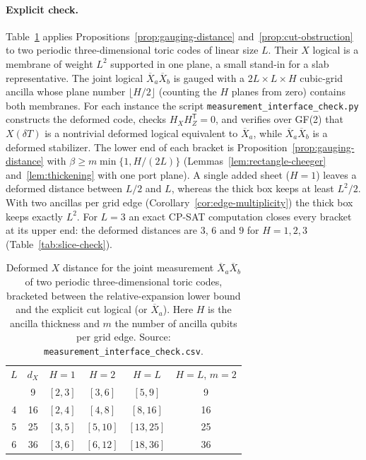 \documentclass[aps,prx,reprint,superscriptaddress,nofootinbib,floatfix,longbibliography]{revtex4-2}
\theoremstyle{definition}
\begin{document}
\paragraph{Explicit check.}
Table~\ref{tab:interface-check} applies
Propositions~\ref{prop:gauging-distance} and~\ref{prop:cut-obstruction} to two
periodic three-dimensional toric codes of linear size $L$.  Their $X$ logical
is a membrane of weight $L^2$ supported in one plane, a small stand-in for a
slab representative.  The joint logical $\overline X_a\overline X_b$ is
gauged with a $2L\times L\times H$ cubic-grid ancilla whose plane number
$\lfloor H/2\rfloor$ (counting the $H$ planes from zero) contains both membranes.  For each instance the script
\texttt{measurement\_interface\_check.py} constructs the deformed code, checks
$H_XH_Z^{\mathsf T}=0$, and verifies over GF(2) that $X(\delta T)$ is a
nontrivial deformed logical equivalent to $\overline X_a$, while
$\overline X_a\overline X_b$ is a deformed stabilizer.  The lower end of each
bracket is Proposition~\ref{prop:gauging-distance} with
$\beta\geq m\min\{1,H/(2L)\}$ (Lemmas~\ref{lem:rectangle-cheeger}
and~\ref{lem:thickening} with one port plane).  A single added sheet ($H=1$)
leaves a deformed distance between $L/2$ and $L$, whereas the thick box keeps
at least $L^2/2$.  With two ancillas per grid edge
(Corollary~\ref{cor:edge-multiplicity}) the thick box keeps exactly $L^2$.
For $L=3$ an exact CP-SAT computation closes every bracket at its upper end:
the deformed distances are $3$, $6$ and $9$ for $H=1,2,3$
(Table~\ref{tab:slice-check}).

\begin{table}[t]
\caption{Deformed $X$ distance for the joint measurement
$\overline X_a\overline X_b$ of two periodic three-dimensional toric codes,
bracketed between the relative-expansion lower bound and the explicit cut
logical (or $\overline X_a$).  Here $H$ is the ancilla thickness and $m$ the
number of ancilla qubits per grid edge.  Source:
\texttt{measurement\_interface\_check.csv}.}
\label{tab:interface-check}
\begin{ruledtabular}
\begin{tabular}{cccccc}
$L$ & $d_X$ & $H=1$ & $H=2$ & $H=L$ & $H=L$, $m=2$\\
\colrule
3 & 9  & $[2,3]$ & $[3,6]$  & $[5,9]$   & 9\\
4 & 16 & $[2,4]$ & $[4,8]$  & $[8,16]$  & 16\\
5 & 25 & $[3,5]$ & $[5,10]$ & $[13,25]$ & 25\\
6 & 36 & $[3,6]$ & $[6,12]$ & $[18,36]$ & 36\\
\end{tabular}
\end{ruledtabular}
\end{table}
\end{document}
